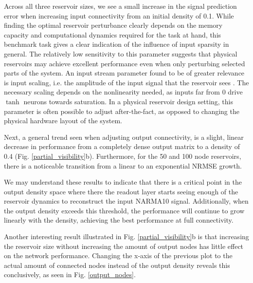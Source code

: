 Across all three reservoir sizes, we see a small increase in the signal
prediction error when increasing input connectivity from an initial density of
0.1. While finding the optimal reservoir perturbance clearly depends on the
memory capacity and computational dynamics required for the task at hand, this
benchmark task gives a clear indication of the influence of input sparsity in
general. The relatively low sensitivity to this parameter suggests that physical
reservoirs may achieve excellent performance even when only perturbing selected
parts of the system. An input stream parameter found to be of greater relevance
is input scaling, i.e. the amplitude of the input signal that the reservoir sees
\cite{alippi_quantification_2009}. The necessary scaling depends on the
nonlinearity needed, as inputs far from 0 drive $\tanh$ neurons towards
saturation. In a physical reservoir design setting, this parameter is often
possible to adjust after-the-fact, as opposed to changing the physical hardware
layout of the system.

Next, a general trend seen when adjusting output connectivity, is a slight,
linear decrease in performance from a completely dense output matrix to a
density of 0.4 (Fig. \ref{partial_visibility}b). Furthermore, for the 50 and 100
node reservoirs, there is a noticeable transition from a linear to an
exponential NRMSE growth.

We may understand these results to indicate that there is a critical point in
the output density space where there the readout layer starts seeing enough of
the reservoir dynamics to reconstruct the input NARMA10 signal. Additionally,
when the output density exceeds this threshold, the performance will continue to
grow linearly with the density, achieving the best performance at full
connectivity.

Another interesting result illustrated in Fig. \ref{partial_visibility}b is that
increasing the reservoir size without increasing the amount of output nodes has
little effect on the network performance. Changing the x-axis of the previous
plot to the actual amount of connected nodes instead of the output density
reveals this conclusively, as seen in Fig. \ref{output_nodes}.

